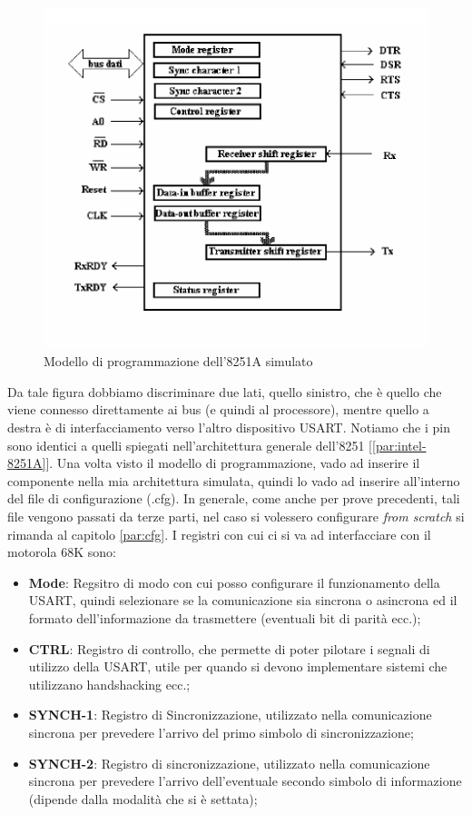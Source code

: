 \begin{figure}[ht]
    \centering
    \includegraphics[width=.5\textwidth]{img/prog-8251A.png}
    \caption{Modello di programmazione dell'8251A simulato}\label{img:prog-8251A}
\end{figure}

Da tale figura dobbiamo discriminare due lati, quello sinistro, che è quello che viene connesso direttamente ai bus (e quindi al processore), mentre quello a destra è di interfacciamento verso l'altro dispositivo USART.
Notiamo che i pin sono identici a quelli spiegati nell'architettura generale dell'8251 [\ref{par:intel-8251A}].
Una volta visto il modello di programmazione, vado ad inserire il componente nella mia architettura simulata, quindi lo vado ad inserire all'interno del file di configurazione (.cfg). In generale, come anche per prove precedenti, tali file vengono passati da terze parti, nel caso si volessero configurare \textit{from scratch} si rimanda al capitolo \ref{par:cfg}.
I registri con cui ci si va ad interfacciare con il motorola 68K sono:
\begin{itemize}
    \item \textbf{Mode}: Regsitro di modo con cui posso configurare il funzionamento della USART, quindi selezionare se la comunicazione sia sincrona o asincrona ed il formato dell'informazione da trasmettere (eventuali bit di parità ecc.);
    \item \textbf{CTRL}: Registro di controllo, che permette di poter pilotare i segnali di utilizzo della USART, utile per quando si devono implementare sistemi che utilizzano handshacking ecc.;
    \item \textbf{SYNCH-1}: Registro di Sincronizzazione, utilizzato nella comunicazione sincrona per prevedere l'arrivo del primo simbolo di sincronizzazione;
    \item \textbf{SYNCH-2}: Registro di sincronizzazione, utilizzato nella comunicazione sincrona per prevedere l'arrivo dell'eventuale secondo simbolo di informazione (dipende dalla modalità che si è settata);
\end{itemize}

